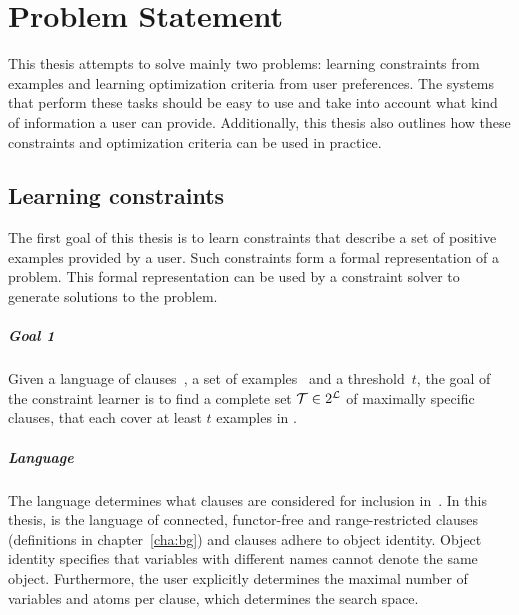 \chapter{Problem Statement}
\label{cha:problem_statement}




This thesis attempts to solve mainly two problems: learning constraints from examples and learning optimization criteria from user preferences.
The systems that perform these tasks should be easy to use and take into account what kind of information a user can provide.
Additionally, this thesis also outlines how these constraints and optimization criteria can be used in practice.

\section{Learning constraints}

The first goal of this thesis is to learn constraints that describe a set of positive examples provided by a user.
Such constraints form a formal representation of a problem.
This formal representation can be used by a constraint solver to generate solutions to the problem.

\label{sec:learning_constraints}

\begin{framed}
	\noindent
	\begin{minipage}{\textwidth}
		\paragraph{Goal 1}
		Given a language of clauses~, a set of examples~ and a threshold~$t$, the goal of the constraint learner is to find a complete set $\mathcal{T} \in 2^{\mathcal{L}}$ of maximally specific clauses, that each cover at least $t$ examples in .
	\end{minipage}
\end{framed}

\paragraph{Language}
The language  determines what clauses are considered for inclusion in~.
In this thesis,  is the language of connected, functor-free and range-restricted clauses (definitions in chapter~\ref{cha:bg}) and clauses adhere to object identity.
Object identity specifies that variables with different names cannot denote the same object.
Furthermore, the user explicitly determines the maximal number of variables and atoms per clause, which determines the search space.

